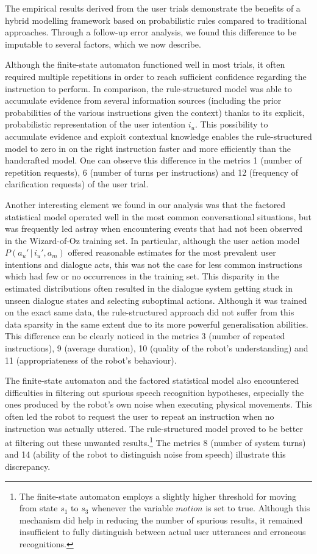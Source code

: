 The empirical results derived from the user trials demonstrate the benefits of a hybrid modelling framework based on probabilistic rules compared to traditional approaches. Through a follow-up error analysis, we found this difference to be imputable to several factors, which we now describe.

Although the finite-state automaton functioned well in most trials, it often required multiple repetitions in order to reach sufficient confidence regarding the instruction to perform.  In comparison, the rule-structured model was able to accumulate evidence from several information sources (including the prior probabilities of the various instructions given the context) thanks to its explicit, probabilistic representation of the user intention $i_u$.  This possibility to accumulate evidence and exploit contextual knowledge enables the rule-structured model to zero in on the right instruction faster and more efficiently than the handcrafted model. One can observe this difference in the metrics 1 (number of repetition requests), 6 (number of turns per instructions) and 12 (frequency of clarification requests) of the user trial.  

Another interesting element we found in our analysis was that the factored statistical model operated well in the most common conversational situations, but was frequently led astray when encountering events that had not been observed in the Wizard-of-Oz training set. In particular, although the user action model $P(a_u'\, | \, i_u', a_m)$ offered reasonable estimates for the most prevalent user intentions and dialogue acts, this was not the case for less common instructions which had few or no occurrences in the training set.  This disparity in the estimated distributions often resulted in the dialogue system getting stuck in unseen dialogue states and selecting suboptimal actions.  Although it was trained on the exact same data, the rule-structured approach did not suffer from this data sparsity in the same extent due to its more powerful generalisation abilities. This difference can be clearly noticed in the metrics 3 (number of repeated instructions), 9 (average duration), 10 (quality of the robot's understanding) and 11 (appropriateness of the robot's behaviour). 

The finite-state automaton and the factored statistical model also encountered difficulties in filtering out spurious speech recognition hypotheses, especially the ones produced by the robot's own noise when executing physical movements.  This often led the robot to request the user to repeat an instruction when no instruction was actually uttered.  The rule-structured model proved to be better at filtering out these unwanted results.\footnote{The finite-state automaton employs a slightly higher threshold for moving from state $s_1$ to $s_3$ whenever the variable $\mathit{motion}$ is set to true. Although this mechanism did help in reducing the number of spurious results, it remained insufficient to fully distinguish between actual user utterances and erroneous recognitions.}  The metrics 8 (number of system turns) and 14 (ability of the robot to distinguish noise from speech) illustrate this discrepancy. 

